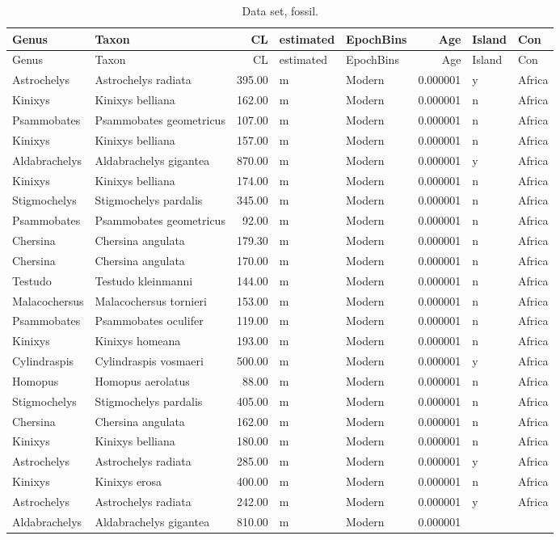 \begin{landscape}

\begin{longtable}[]{@{}llrllrll@{}}
	\caption{Data set, fossil.}\tabularnewline
	\toprule
	Genus & Taxon & CL & estimated & EpochBins & Age & Island &
	Con\tabularnewline
	\midrule
	\endfirsthead
	\toprule
	Genus & Taxon & CL & estimated & EpochBins & Age & Island &
	Con\tabularnewline
	\midrule
	\endhead
	Astrochelys & Astrochelys radiata & 395.00 & m & Modern & 0.000001 & y &
	Africa\tabularnewline
	Kinixys & Kinixys belliana & 162.00 & m & Modern & 0.000001 & n &
	Africa\tabularnewline
	Psammobates & Psammobates geometricus & 107.00 & m & Modern & 0.000001 &
	n & Africa\tabularnewline
	Kinixys & Kinixys belliana & 157.00 & m & Modern & 0.000001 & n &
	Africa\tabularnewline
	Aldabrachelys & Aldabrachelys gigantea & 870.00 & m & Modern & 0.000001
	& y & Africa\tabularnewline
	Kinixys & Kinixys belliana & 174.00 & m & Modern & 0.000001 & n &
	Africa\tabularnewline
	Stigmochelys & Stigmochelys pardalis & 345.00 & m & Modern & 0.000001 &
	n & Africa\tabularnewline
	Psammobates & Psammobates geometricus & 92.00 & m & Modern & 0.000001 &
	n & Africa\tabularnewline
	Chersina & Chersina angulata & 179.30 & m & Modern & 0.000001 & n &
	Africa\tabularnewline
	Chersina & Chersina angulata & 170.00 & m & Modern & 0.000001 & n &
	Africa\tabularnewline
	Testudo & Testudo kleinmanni & 144.00 & m & Modern & 0.000001 & n &
	Africa\tabularnewline
	Malacochersus & Malacochersus tornieri & 153.00 & m & Modern & 0.000001
	& n & Africa\tabularnewline
	Psammobates & Psammobates oculifer & 119.00 & m & Modern & 0.000001 & n
	& Africa\tabularnewline
	Kinixys & Kinixys homeana & 193.00 & m & Modern & 0.000001 & n &
	Africa\tabularnewline
	Cylindraspis & Cylindraspis vosmaeri & 500.00 & m & Modern & 0.000001 &
	y & Africa\tabularnewline
	Homopus & Homopus aerolatus & 88.00 & m & Modern & 0.000001 & n &
	Africa\tabularnewline
	Stigmochelys & Stigmochelys pardalis & 405.00 & m & Modern & 0.000001 &
	n & Africa\tabularnewline
	Chersina & Chersina angulata & 162.00 & m & Modern & 0.000001 & n &
	Africa\tabularnewline
	Kinixys & Kinixys belliana & 180.00 & m & Modern & 0.000001 & n &
	Africa\tabularnewline
	Astrochelys & Astrochelys radiata & 285.00 & m & Modern & 0.000001 & y &
	Africa\tabularnewline
	Kinixys & Kinixys erosa & 400.00 & m & Modern & 0.000001 & n &
	Africa\tabularnewline
	Astrochelys & Astrochelys radiata & 242.00 & m & Modern & 0.000001 & y &
	Africa\tabularnewline
	Aldabrachelys & Aldabrachelys gigantea & 810.00 & m & Modern & 0.000001

\end{longtable}
\end{landscape}
